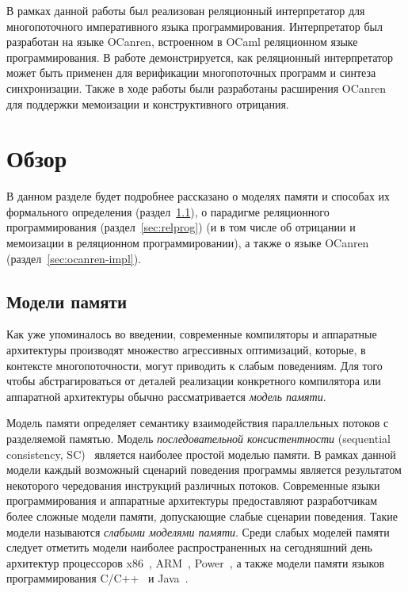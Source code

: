 В рамках данной работы был реализован реляционный интерпретатор
для многопоточного императивного языка программирования.
Интерпретатор был разработан на языке OCanren, 
встроенном в OCaml реляционном языке программирования.
В работе демонстрируется, как реляционный интерпретатор
может быть применен для верификации многопоточных программ 
и синтеза синхронизации.
Также в ходе работы были разработаны расширения OCanren для 
поддержки мемоизации и конструктивного отрицания.

\section{Обзор}

В данном разделе будет подробнее рассказано о 
моделях памяти и способах их формального определения (раздел~\ref{sec:mem-model}),
о парадигме реляционного программирования (раздел~\ref{sec:relprog})
(и в том числе об отрицании и мемоизации в реляционном программировании),
а также о языке OCanren (раздел~\ref{sec:ocanren-impl}).

\subsection{Модели памяти}

\label{sec:mem-model}

Как уже упоминалось во введении,
современные компиляторы и аппаратные архитектуры производят множество 
агрессивных оптимизаций, которые, в контексте многопоточности, 
могут приводить к слабым поведениям.
Для того чтобы абстрагироваться от деталей реализации конкретного 
компилятора или аппаратной архитектуры обычно рассматривается 
\emph{модель памяти}.

Модель памяти определяет семантику взаимодействия 
параллельных потоков с разделяемой памятью.
Модель \emph{последовательной консистентности} 
(sequential consistency, SC)~\cite{lamport1979make} 
является наиболее простой моделью памяти.
В рамках данной модели каждый возможный сценарий поведения программы 
является результатом некоторого чередования инструкций различных потоков.
Современные языки программирования и аппаратные архитектуры 
предоставляют разработчикам более сложные модели памяти,
допускающие слабые сценарии поведения.
Такие модели называются \emph{слабыми моделями памяти}.
Среди слабых моделей памяти следует отметить
модели наиболее распространенных на сегодняшний день архитектур процессоров
x86~\cite{sewell2010x86}, ARM~\cite{flur2016modelling}, Power~\cite{sarkar2011understanding},
а также модели памяти языков программирования 
C/C++~\cite{batty2011mathematizing} и Java~\cite{manson2005java}.

